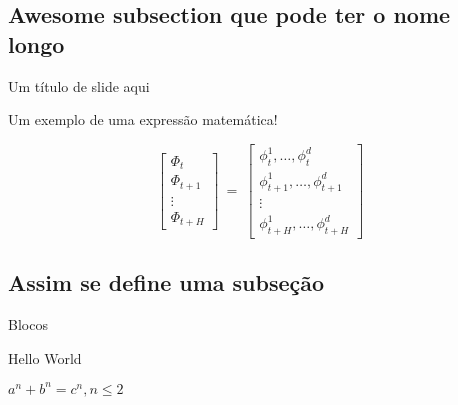 \documentclass[aspectratio=169]{beamer}
\begin{document}
\subsection{Awesome subsection que pode ter o nome longo}
\begin{frame}{Um título de slide aqui}

	Um exemplo de uma expressão matemática!

	\begin{equation}
		\begin{bmatrix}
	        \Phi_t \\
	        \Phi_{t+1} \\
	        \vdots \\
	        \Phi_{t+H}
	    \end{bmatrix}
	    ~=~
	    \begin{bmatrix}
	        \phi_t^1, \ldots, \phi_t^d \\
	        \phi_{t+1}^1, \ldots, \phi_{t+1}^d \\
	        \vdots \\
	        \phi_{t+H}^1, \ldots, \phi_{t+H}^d
	    \end{bmatrix}
		\label{eq:random}
	\end{equation}

\end{frame}





\subsection{Assim se define uma subseção}

\begin{frame}{Blocos}

\begin{defi}
Hello World
\end{defi}

\begin{teo}
$a^n + b^n = c^n, n \leq 2$
\end{teo}


\end{frame}
\end{document}
